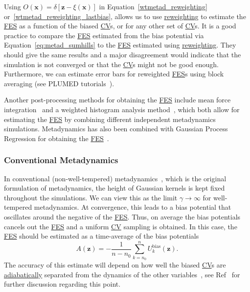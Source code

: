 \documentclass[9pt,review]{livecoms}
\newcommand{\vx}{\mathbf{x}}
\newcommand{\vz}{\mathbf{z}}
\begin{document}
Using $O(\vx) = \delta[\vz-\xi(\vx)]$ in Equation~\ref{wtmetad_reweighting} or~\ref{wtmetad_reweighting_lastbias}, allows us to use \hyperlink{ref:Reweighting} {reweighting} to estimate the \hyperlink{ref:FES} {FES} as a function of the biased \hyperlink{ref:CV} {CV}s, or for any other set of \hyperlink{ref:CV} {CV}s. It is a good practice to compare the \hyperlink{ref:FES} {FES} estimated from the bias potential via Equation~\ref{eq:metad_sumhills} to the \hyperlink{ref:FES} {FES} estimated using \hyperlink{ref:Reweighting} {reweighting}. They should give the same results and a major disagreement would indicate that the simulation is not converged or that the \hyperlink{ref:CV} {CV}s might not be good enough. Furthermore, we can estimate error bars for reweighted \hyperlink{ref:FES} {FES}s using block averaging (see PLUMED tutorials~\cite{plumed_masterclass}).

Another post-processing methods for obtaining the \hyperlink{ref:FES} {FES} include mean force integration~\cite{10.1063/1.5123498} and a weighted histogram analysis method~\cite{10.1016/j.cplett.2020.137384}, which both allow for estimating the \hyperlink{ref:FES} {FES} by combining different independent metadynamics simulations. Metadynamics has also been combined with Gaussian Process Regression for obtaining the \hyperlink{ref:FES} {FES}~\cite{Mones2016}.


\subsubsection{Conventional Metadynamics}
\label{sec:meta-classic}

In conventional (non-well-tempered) metadynamics~\cite{Laio-PNAS-2002}, which is the original formulation of metadynamics, the height of Gaussian kernels is kept fixed throughout the simulations. We can view this as the limit $
\gamma \to \infty$ for well-tempered metadynamics. At convergence, this leads to a bias potential that oscillates around the negative of the \hyperlink{ref:FES} {FES}. Thus, on average the bias potentials cancels out the \hyperlink{ref:FES} {FES} and a uniform \hyperlink{ref:CV} {CV} sampling is obtained. In this case, the \hyperlink{ref:FES} {FES} should be estimated as a time-average of the bias potentials~\cite{BussiLaio_ReviewMetaD_2020}
\begin{equation}
A(\vz) = - \frac{1}{n-n_0} \sum^{n}_{k=n_0} U^{\mathrm{bias}}_k(\vz).
\end{equation}
The accuracy of this estimate will depend on how well the biased \hyperlink{ref:CV} {CV}s are \hyperlink{ref:AdiabaticDyn} {adiabatically} separated from the dynamics of the other variables~\cite{laio-gervasio-08,jourdain-lelievre-zitt-21}, see Ref~\cite{BussiLaio_ReviewMetaD_2020} for further discussion regarding this point.
\end{document}
